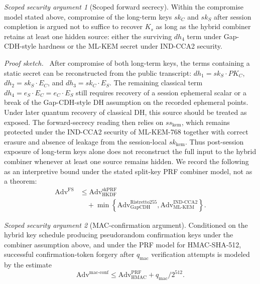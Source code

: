 \documentclass{ieeeijc}
\theoremstyle{remark}
\newtheorem{claim}{Scoped security argument}[section]
\newenvironment{sketchproof}{\par\noindent\textit{Proof sketch.}\ }{\par}
\begin{document}
\begin{claim}[Scoped forward secrecy]
Within the compromise model stated above, compromise of the long-term
keys $sk_C$ and $sk_S$ after session completion is argued not to suffice
to recover $K_s$ as long as the hybrid combiner retains at least one hidden
source: either the surviving $dh_4$ term under Gap-CDH-style hardness or the
ML-KEM secret under IND-CCA2 security.
\end{claim}

\begin{sketchproof}
After compromise of both long-term keys, the terms containing a static
secret can be reconstructed from the public transcript:
$dh_1 = sk_S \cdot PK_C$, $dh_2 = sk_S \cdot E_C$, and
$dh_3 = sk_C \cdot E_S$. The remaining classical term
$dh_4 = e_S \cdot E_C = e_C \cdot E_S$ still requires recovery of a
session ephemeral scalar or a break of the Gap-CDH-style DH assumption on
the recorded ephemeral points. Under later quantum recovery of classical
DH, this source should be treated as exposed. The forward-secrecy reading
then relies on $ss_{\mathrm{kem}}$, which remains protected under the
IND-CCA2 security of ML-KEM-768 together with correct erasure and absence of
leakage from the session-local $sk_{\mathrm{kem}}$. Thus post-session
exposure of long-term keys alone does not reconstruct the full input to the
hybrid combiner whenever at least one source remains hidden. We record the
following as an interpretive bound under the stated split-key PRF combiner
model, not as a theorem:
\begin{equation}
  \label{eq:fs-advantage-bound}
  \begin{aligned}
    \mathrm{Adv}^{\mathrm{FS}}
    &\leq \mathrm{Adv}_{\mathrm{HKDF}}^{\mathrm{skPRF}}\\
    &\quad + \min\!\left\{
      \mathrm{Adv}_{\mathrm{GapCDH}}^{\mathrm{Ristretto255}},
      \mathrm{Adv}_{\mathrm{ML\text{-}KEM}}^{\mathrm{IND\text{-}CCA2}}
    \right\}.
  \end{aligned}
\end{equation}
\end{sketchproof}

\begin{claim}[MAC-confirmation argument]
Conditioned on the hybrid key schedule producing pseudorandom confirmation
keys under the combiner assumption above, and under the PRF model for
HMAC-SHA-512, successful confirmation-token forgery after $q_{\mathrm{mac}}$
verification attempts is modeled by the estimate
\begin{equation}
  \label{eq:mac-confirmation-bound}
  \mathrm{Adv}^{\mathrm{mac\text{-}conf}} \leq
  \mathrm{Adv}_{\mathrm{HMAC}}^{\mathrm{PRF}} +
  q_{\mathrm{mac}} / 2^{512}.
\end{equation}
\end{claim}
\end{document}
